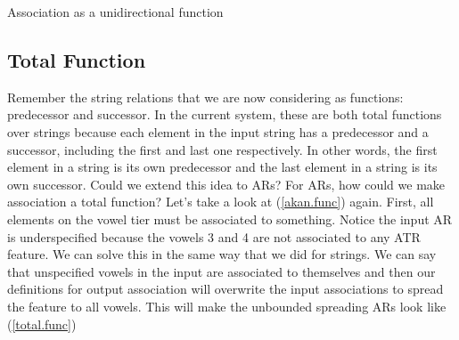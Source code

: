 \documentclass[,doc,floatsintext]{apa6}
\theoremstyle{definition}
\theoremstyle{definition}
\theoremstyle{definition}
\theoremstyle{remark}
\begin{document}
\begin{exe}
\ex \label{akan.func} Association as a unidirectional function \\
\end{exe}

\subsection{Total Function}\label{total-function}

Remember the string relations that we are now considering as functions:
predecessor and successor. In the current system, these are both total
functions over strings because each element in the input string has a
predecessor and a successor, including the first and last one
respectively. In other words, the first element in a string is its own
predecessor and the last element in a string is its own successor. Could
we extend this idea to ARs? For ARs, how could we make association a
total function? Let's take a look at (\ref{akan.func}) again. First, all
elements on the vowel tier must be associated to something. Notice the
input AR is underspecified because the vowels 3 and 4 are not associated
to any ATR feature. We can solve this in the same way that we did for
strings. We can say that unspecified vowels in the input are associated
to themselves and then our definitions for output association will
overwrite the input associations to spread the feature to all vowels.
This will make the unbounded spreading ARs look like (\ref{total.func})
\end{document}
